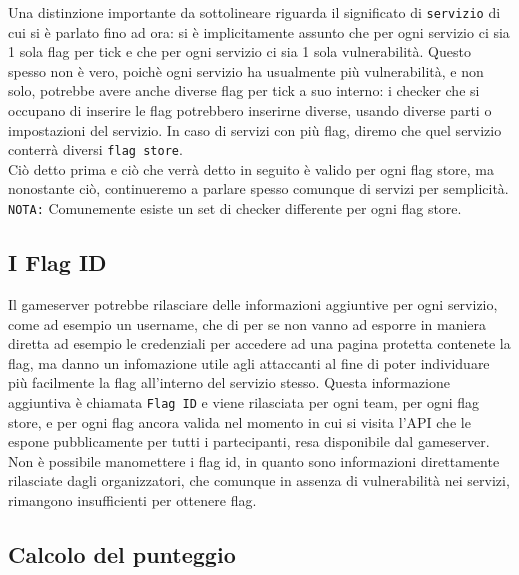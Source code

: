 Una distinzione importante da sottolineare riguarda il significato di \texttt{servizio} di cui si è parlato fino ad ora:
si è implicitamente assunto che per ogni servizio ci sia 1 sola flag per tick e che per ogni servizio ci sia 1 sola vulnerabilità.
Questo spesso non è vero, poichè ogni servizio ha usualmente più vulnerabilità, e non solo, potrebbe avere anche diverse flag per tick a suo interno:
i checker che si occupano di inserire le flag potrebbero inserirne diverse, usando diverse parti o impostazioni del servizio.
In caso di servizi con più flag, diremo che quel servizio conterrà diversi \texttt{flag store}.\\
Ciò detto prima e ciò che verrà detto in seguito è valido per ogni flag store, ma nonostante ciò, continueremo a parlare spesso comunque di servizi per semplicità.\\
\texttt{NOTA:} Comunemente esiste un set di checker differente per ogni flag store.

\subsection{I Flag ID}

Il gameserver potrebbe rilasciare delle informazioni aggiuntive per ogni servizio, come ad esempio un username, che di per se non vanno
ad esporre in maniera diretta ad esempio le credenziali per accedere ad una pagina protetta contenete la flag, ma danno un infomazione utile agli attaccanti al fine di poter
individuare più facilmente la flag all'interno del servizio stesso.
Questa informazione aggiuntiva è chiamata \texttt{Flag ID} e viene rilasciata per ogni team, per ogni flag store, e per ogni flag ancora valida nel momento in cui si visita l'API che
le espone pubblicamente per tutti i partecipanti, resa disponibile dal gameserver. Non è possibile manomettere i flag id, in quanto sono informazioni direttamente rilasciate dagli
organizzatori, che comunque in assenza di vulnerabilità nei servizi, rimangono insufficienti per ottenere flag.

\subsection{Calcolo del punteggio}

